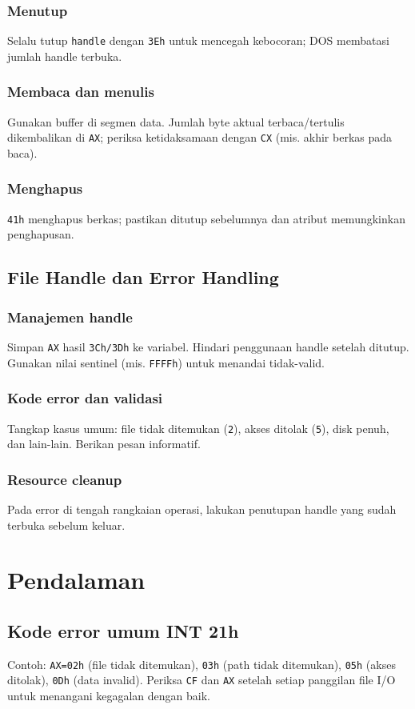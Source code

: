 \subsubsection{Menutup}
Selalu tutup \texttt{handle} dengan \texttt{3Eh} untuk mencegah kebocoran; DOS membatasi jumlah handle terbuka.

\subsubsection{Membaca dan menulis}
Gunakan buffer di segmen data. Jumlah byte aktual terbaca/tertulis dikembalikan di \texttt{AX}; periksa ketidaksamaan dengan \texttt{CX} (mis. akhir berkas pada baca).

\subsubsection{Menghapus}
\texttt{41h} menghapus berkas; pastikan ditutup sebelumnya dan atribut memungkinkan penghapusan.

\subsection{File Handle dan Error Handling}
\subsubsection{Manajemen handle}
Simpan \texttt{AX} hasil \texttt{3Ch/3Dh} ke variabel. Hindari penggunaan handle setelah ditutup. Gunakan nilai sentinel (mis. \texttt{FFFFh}) untuk menandai tidak-valid.

\subsubsection{Kode error dan validasi}
Tangkap kasus umum: file tidak ditemukan (\texttt{2}), akses ditolak (\texttt{5}), disk penuh, dan lain-lain. Berikan pesan informatif.

\subsubsection{Resource cleanup}
Pada error di tengah rangkaian operasi, lakukan penutupan handle yang sudah terbuka sebelum keluar.

\section{Pendalaman}\label{sec:fileio-pendalaman}
\subsection{Kode error umum INT 21h}
Contoh: \texttt{AX=02h} (file tidak ditemukan), \texttt{03h} (path tidak ditemukan), \texttt{05h} (akses ditolak), \texttt{0Dh} (data invalid). Periksa \texttt{CF} dan \texttt{AX} setelah setiap panggilan file I/O untuk menangani kegagalan dengan baik. \cite{rbil}

